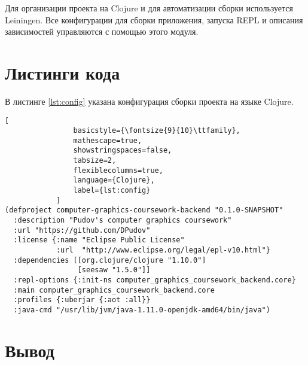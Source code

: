 Для организации проекта на Clojure и для автоматизации сборки используется Leiningen.
Все конфигурации для сборки приложения, запуска REPL и описания зависимостей управляются с помощью
этого модуля\cite{site:lein}.

\section{Листинги кода}

В листинге \ref{lst:config} указана конфигурация сборки проекта на языке Clojure.

\begin{lstlisting}[
                basicstyle={\fontsize{9}{10}\ttfamily},
                mathescape=true,
                showstringspaces=false,
                tabsize=2,
                flexiblecolumns=true,
                language={Clojure},
                label={lst:config}
            ]
(defproject computer-graphics-coursework-backend "0.1.0-SNAPSHOT"
  :description "Pudov's computer graphics coursework"
  :url "https://github.com/DPudov"
  :license {:name "Eclipse Public License"
            :url  "http://www.eclipse.org/legal/epl-v10.html"}
  :dependencies [[org.clojure/clojure "1.10.0"]
                 [seesaw "1.5.0"]]
  :repl-options {:init-ns computer_graphics_coursework_backend.core}
  :main computer_graphics_coursework_backend.core
  :profiles {:uberjar {:aot :all}}
  :java-cmd "/usr/lib/jvm/java-1.11.0-openjdk-amd64/bin/java")
\end{lstlisting}
\section{Вывод}

